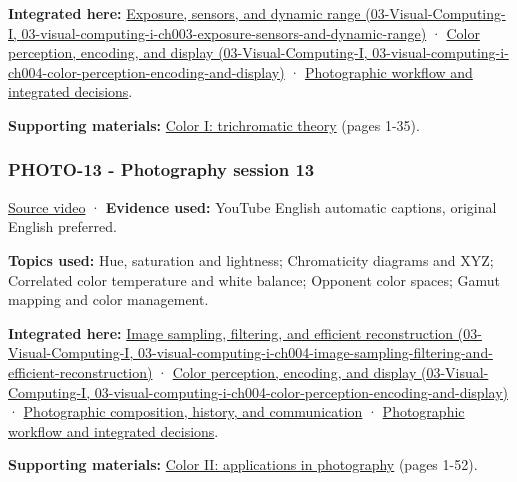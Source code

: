 \textbf{Integrated here:} \href{../03-Visual-Computing-I/main.pdf\#nameddest=03-visual-computing-i-ch003-exposure-sensors-and-dynamic-range}{Exposure, sensors, and dynamic range (03-Visual-Computing-I, 03-visual-computing-i-ch003-exposure-sensors-and-dynamic-range)} · \href{../03-Visual-Computing-I/main.pdf\#nameddest=03-visual-computing-i-ch004-color-perception-encoding-and-display}{Color perception, encoding, and display (03-Visual-Computing-I, 03-visual-computing-i-ch004-color-perception-encoding-and-display)} · \hyperref[04-visual-computing-ii-ch034-photographic-workflow-and-integrated-decisions]{Photographic workflow and integrated decisions}.

\textbf{Supporting materials:} \href{https://drive.google.com/open?id=0B6w2XfPHEcZYekpvMVN6MkdlZ0U}{Color I: trichromatic theory} (pages 1-35).

\subsubsection{PHOTO-13 - Photography session 13}\label{04-visual-computing-ii-ch036-photo-13---photography-session-13}

\href{https://www.youtube.com/watch?v=6T_4mVZcozs}{Source video} · \textbf{Evidence used:} YouTube English automatic captions, original English preferred.

\textbf{Topics used:} Hue, saturation and lightness; Chromaticity diagrams and XYZ; Correlated color temperature and white balance; Opponent color spaces; Gamut mapping and color management.

\textbf{Integrated here:} \href{../03-Visual-Computing-I/main.pdf\#nameddest=03-visual-computing-i-ch004-image-sampling-filtering-and-efficient-reconstruction}{Image sampling, filtering, and efficient reconstruction (03-Visual-Computing-I, 03-visual-computing-i-ch004-image-sampling-filtering-and-efficient-reconstruction)} · \href{../03-Visual-Computing-I/main.pdf\#nameddest=03-visual-computing-i-ch004-color-perception-encoding-and-display}{Color perception, encoding, and display (03-Visual-Computing-I, 03-visual-computing-i-ch004-color-perception-encoding-and-display)} · \hyperref[04-visual-computing-ii-ch034-photographic-composition-history-and-communication]{Photographic composition, history, and communication} · \hyperref[04-visual-computing-ii-ch034-photographic-workflow-and-integrated-decisions]{Photographic workflow and integrated decisions}.

\textbf{Supporting materials:} \href{https://drive.google.com/open?id=0B6w2XfPHEcZYWllrZHZzRHlZWlk}{Color II: applications in photography} (pages 1-52).

